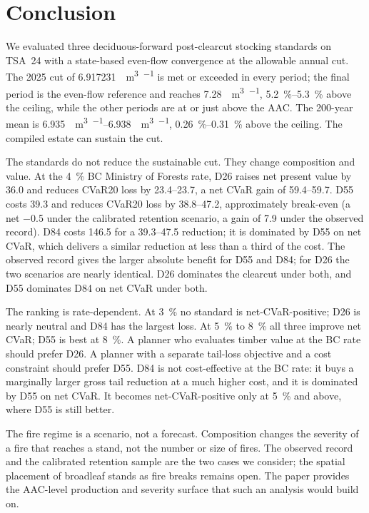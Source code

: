 \section{Conclusion}
\label{sec:conclusion}

We evaluated three deciduous-forward post-clearcut stocking standards on TSA~24 with a state-based
even-flow convergence at the allowable annual cut. The 2025 cut of
\SI{6.917231}{\mega\cubic\meter\per\year} is met or exceeded in every period; the final period is the
even-flow reference and reaches \SI{7.28}{\mega\cubic\meter\per\year},
\SIrange{5.2}{5.3}{\percent} above the ceiling, while the other periods are at or just above the
AAC. The 200-year mean is
\SIrange{6.935}{6.938}{\mega\cubic\meter\per\year}, \SIrange{0.26}{0.31}{\percent} above the
ceiling. The compiled estate can sustain the cut.

The standards do not reduce the sustainable cut. They change composition and value. At the \SI{4}{\percent} BC
Ministry of Forests rate, D26 raises net present value by \SI{36.0}{\millionCAD} and reduces CVaR20
loss by \SIrange{23.4}{23.7}{\millionCAD}, a net CVaR gain of \SIrange{59.4}{59.7}{\millionCAD}. D55
costs \SI{39.3}{\millionCAD} and reduces CVaR20 loss by \SIrange{38.8}{47.2}{\millionCAD},
approximately break-even (a net \SI{-0.5}{\millionCAD} under the calibrated retention scenario, a gain
of \SI{7.9}{\millionCAD} under the observed record). D84 costs \SI{146.5}{\millionCAD} for a
\SIrange{39.3}{47.5}{\millionCAD} reduction; it is dominated by D55 on net CVaR, which delivers a similar
reduction at less than a third of the cost. The observed record gives the larger absolute benefit for D55 and
D84; for D26 the two scenarios are nearly identical. D26 dominates the clearcut under both, and D55
dominates D84 on net CVaR under both.

The ranking is rate-dependent. At \SI{3}{\percent} no standard is net-CVaR-positive; D26 is nearly neutral and D84
has the largest loss. At \SI{5}{\percent} to \SI{8}{\percent} all three improve net CVaR; D55 is best at
\SI{8}{\percent}. A planner who evaluates timber value at the BC rate should prefer D26. A planner
with a separate tail-loss objective and a cost constraint should prefer D55. D84 is not
cost-effective at the BC rate: it buys a marginally larger gross tail reduction at a much higher
cost, and it is dominated by D55 on net CVaR. It becomes net-CVaR-positive only at \SI{5}{\percent} and
above, where D55 is still better.

The fire regime is a scenario, not a forecast. Composition changes the severity of a fire that
reaches a stand, not the number or size of fires. The observed record and the calibrated retention
sample are the two cases we consider; the spatial placement of broadleaf stands as fire breaks
remains open. The paper provides the AAC-level production and severity surface that such an analysis
would build on.

